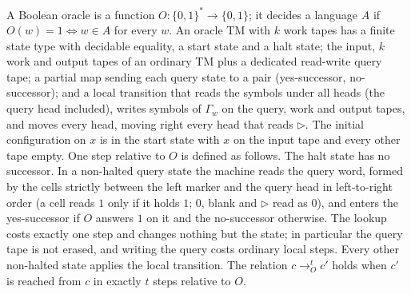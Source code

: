 \begin{definition}
  \label{def:barriers-oracle-tm}
  \leanok
  A Boolean oracle is a function $O : \{0,1\}^* \to \{0,1\}$; it decides a
  language $A$ if $O(w) = 1 \iff w \in A$ for every $w$. An oracle TM with $k$
  work tapes has a finite state type with decidable equality, a start state
  and a halt state; the input, $k$ work and output tapes of an ordinary TM plus
  a dedicated read-write query tape; a partial map sending each query state to
  a pair (yes-successor, no-successor); and a local transition that reads the
  symbols under all heads (the query head included), writes symbols of
  $\Gamma_w$ on the query, work and output tapes, and moves every head, moving
  right every head that reads $\triangleright$. The initial configuration on
  $x$ is in the start state with $x$ on the input tape and every other tape
  empty. One step relative to $O$ is defined as follows. The halt state has no
  successor. In a non-halted query state the machine reads the query word,
  formed by the cells strictly between the left marker and the query head in
  left-to-right order (a cell reads $1$ only if it holds $1$; $0$, blank and
  $\triangleright$ read as $0$), and enters the yes-successor if $O$ answers
  $1$ on it and the no-successor otherwise. The lookup costs exactly one step
  and changes nothing but the state; in particular the query tape is not
  erased, and writing the query costs ordinary local steps. Every other
  non-halted state applies the local transition. The relation
  $c \to_O^t c'$ holds when $c'$ is reached from $c$ in exactly $t$ steps
  relative to $O$.
\end{definition}

